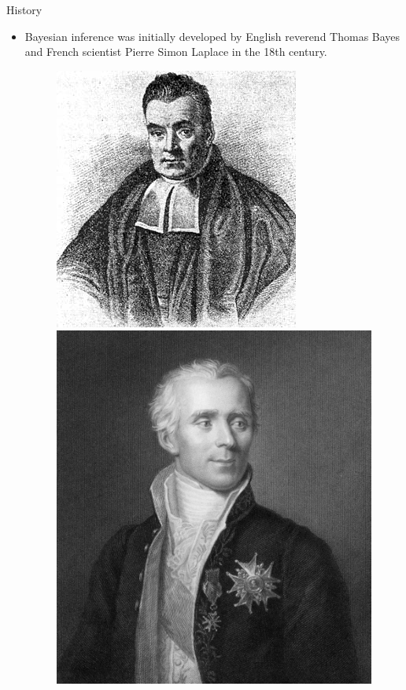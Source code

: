 \documentclass[handout]{beamer}
\begin{document}
\begin{frame}{History}
\scriptsize{

\begin{itemize}
\item Bayesian inference was initially developed by English reverend Thomas Bayes and French scientist Pierre Simon Laplace in the 18th century.  

\begin{figure}[h!]
	\centering
	\includegraphics[scale=0.35]{pics/Bayes.jpeg}
	\includegraphics[scale=0.08]{pics/laplace.jpg}
	

\end{figure}
\end{itemize}}
\end{frame}
\end{document}
